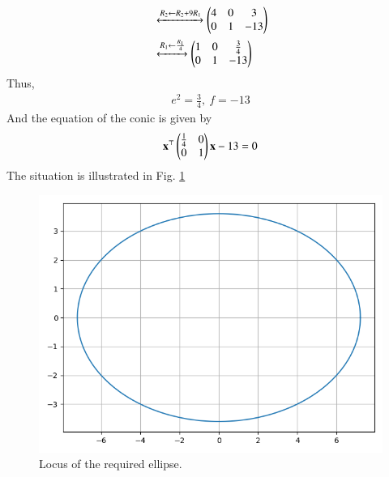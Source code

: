 \documentclass[journal,12pt,twocolumn]{IEEEtran}
\renewcommand{\vec}[1]{\boldsymbol{\mathbf{#1}}}
\begin{document}
\begin{enumerate}
\begin{align}
                 &\xleftrightarrow[]{R_2\leftarrow R_2+9R_1}\begin{pmatrix}4&0&3\\0&1&-13\end{pmatrix} \\
                 &\xleftrightarrow[]{R_1\leftarrow\frac{R_1}{4}}\begin{pmatrix}1&0&\frac{3}{4}\\0&1&-13\end{pmatrix} \\
    \end{align}
    Thus,
    \begin{align}
        e^2 = \frac{3}{4},\ f = -13
    \end{align}
    And the equation of the conic is given by
    \begin{align}
        \vec{x}^\top\myvec{\frac{1}{4}&0\\0&1}\vec{x} - 13 = 0
    \end{align}
    The situation is illustrated in Fig. \ref{fig:ellipse}
    \begin{figure}[!ht]
        \centering
        \includegraphics[width=\columnwidth]{figs/ellipse.png}
        \caption{Locus of the required ellipse.}
        \label{fig:ellipse}
    \end{figure}
\end{enumerate}
\end{document}
